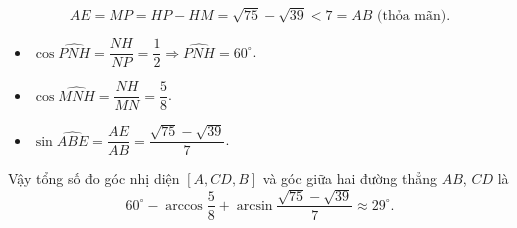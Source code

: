 \begin{ex}
{		$$AE = MP = HP - HM = \sqrt{75} - \sqrt{39} < 7 = AB \text{ (thỏa mãn).}$$
		\begin{itemize}
			\item $\cos \widehat{PNH} = \dfrac{NH}{NP} = \dfrac{1}{2} \Rightarrow \widehat{PNH} = 60^\circ$.
			\item $\cos \widehat{MNH} = \dfrac{NH}{MN} = \dfrac{5}{8}$.
			\item $\sin \widehat{ABE} = \dfrac{AE}{AB} = \dfrac{\sqrt{75} - \sqrt{39}}{7}$.
		\end{itemize}
		Vậy tổng số đo góc nhị diện $\left[A,CD,B\right]$ và góc giữa hai đường thẳng $AB$, $CD$ là
		$$60^\circ - \arccos\dfrac{5}{8} + \arcsin \dfrac{\sqrt{75} - \sqrt{39}}{7} \approx 29^\circ.$$
	}
\end{ex}

